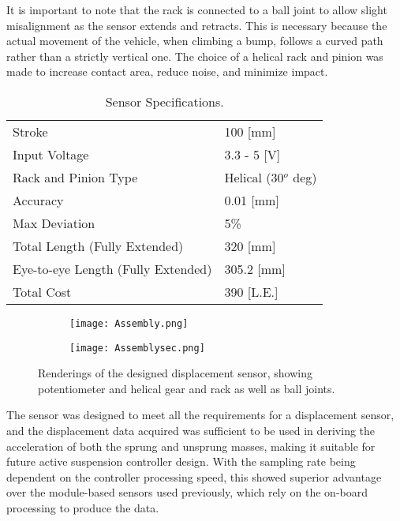 It is important to note that the rack is connected to a ball joint to allow slight misalignment as the sensor extends and retracts.
This is necessary because the actual movement of the vehicle, when climbing a bump, follows a curved path rather than a strictly vertical one.
The choice of a helical rack and pinion was made to increase contact area, reduce noise, and minimize impact.
\begin{table}[H]
    \centering
    \caption{Sensor Specifications.}
    \begin{tabular}{ l|l }
        \hline
        Stroke                             & 100 [mm]             \\
        Input Voltage                      & 3.3 - 5 [V]          \\
        Rack and Pinion Type               & Helical (30$^o$ deg) \\
        Accuracy                           & 0.01 [mm]            \\
        Max Deviation                      & 5\%                  \\
        Total Length (Fully Extended)      & 320 [mm]             \\
        Eye-to-eye Length (Fully Extended) & 305.2 [mm]           \\
        Total Cost                         & 390 [L.E.]           \\
        \hline
    \end{tabular}
    \label{table:sensor}
\end{table}

\begin{figure}[H]
    \centering
    \begin{subfigure}{\textwidth}
        \centering
        \texttt{[image: Assembly.png]}
    \end{subfigure}
    \begin{subfigure}{\textwidth}
        \centering
        \texttt{[image: Assemblysec.png]}
    \end{subfigure}
    \caption{Renderings of the designed displacement sensor, showing potentiometer and helical gear and rack as well as ball joints.}
    \label{fig:sensor renderings}
\end{figure}

The sensor was designed to meet all the requirements for a displacement sensor, and the displacement data acquired was sufficient to be used in deriving the acceleration of both the sprung and unsprung masses, making it suitable for future active suspension controller design.
With the sampling rate being dependent on the controller processing speed, this showed superior advantage over the module-based sensors used previously, which rely on the on-board processing to produce the data.

